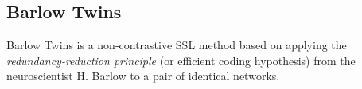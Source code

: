 \documentclass[../../thesis.tex]{subfiles}
\begin{document}






\subsection{Barlow Twins}
Barlow Twins is a non-contrastive SSL method based on applying the \textit{redundancy-reduction principle} (or efficient coding hypothesis) \cite{Barlow_origin} from the neuroscientist H. Barlow to a pair of identical networks.\newline  
\end{document}
